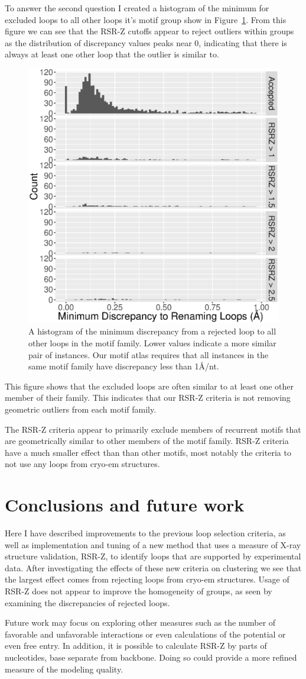 To answer the second question I created a histogram of the minimum for excluded
loops to all other loops it's motif group show in
Figure~\ref{fig:exclude-min-disc}. From this figure we can see that the RSR-Z
cutoffs appear to reject outliers within groups as the distribution of
discrepancy values peaks near 0, indicating that there is always at least one
other loop that the outlier is similar to.

\begin{figure}
  \includegraphics[width=0.5\linewidth]{chapter-5/figs/motifs/discrepancy-to-kept}
  \caption{A histogram of the minimum discrepancy from a rejected loop to all
    other loops in the motif family. Lower values indicate a more similar pair
    of instances. Our motif atlas requires that all instances in the same motif
  family have discrepancy less than 1{\AA}/nt.}
  \label{fig:exclude-min-disc}
\end{figure}

This figure shows that the excluded loops are often similar to at least one
other member of their family. This indicates that our RSR-Z criteria is not
removing geometric outliers from each motif family.

The RSR-Z criteria appear to primarily exclude members of recurrent motifs that
are geometrically similar to other members of the motif family. RSR-Z criteria
have a much smaller effect than than other motifs, most notably the criteria to
not use any loops from cryo-em structures.

\section{Conclusions and future work}

Here I have described improvements to the previous loop selection criteria, as
well as implementation and tuning of a new method that uses a measure of X-ray
structure validation, RSR-Z, to identify loops that are supported by
experimental data. After investigating the effects of these new criteria on
clustering we see that the largest effect comes from rejecting loops from
cryo-em structures. Usage of RSR-Z does not appear to improve the homogeneity of
groups, as seen by examining the discrepancies of rejected loops.

Future work may focus on exploring other measures such as the number of
favorable and unfavorable interactions or even calculations of the potential or
even free entry. In addition, it is possible to calculate RSR-Z by parts of
nucleotides, base separate from backbone. Doing so could provide a more refined
measure of the modeling quality.
